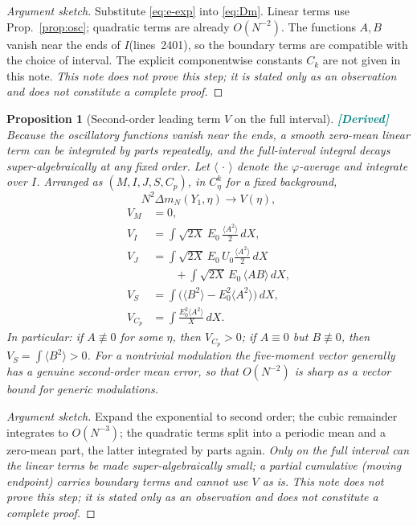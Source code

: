 \documentclass[11pt,a4paper]{article}
\newtheorem{proposition}[theorem]{Proposition}
\theoremstyle{definition}
\theoremstyle{remark}
\newcommand{\lnos}[1]{(lines~#1)}
\newcommand{\DER}{\textcolor{teal}{\textbf{[Derived]}}}
\newcommand{\notproved}{\emph{This note does not prove this step; it is stated only as an observation
and does not constitute a complete proof.}}
\begin{document}
\begin{proof}[Argument sketch]
Substitute \eqref{eq:e-exp} into \eqref{eq:Dm}. Linear terms use Prop.~\ref{prop:osc};
quadratic terms are already $O(N^{-2})$. The functions $A,B$ vanish near the ends of $I$\lnos{2401},
so the boundary terms are compatible with the choice of interval.
The explicit componentwise constants $C_k$ are not given in this note.
\notproved
\end{proof}

\begin{proposition}[Second-order leading term $V$ on the full interval]
\label{prop:V}
\DER
Because the oscillatory functions vanish near the ends, a smooth zero-mean linear term can be integrated
by parts repeatedly, and the full-interval integral decays super-algebraically at any fixed order.
Let $\langle\,\cdot\,\rangle$ denote the $\varphi$-average and integrate over $I$. Arranged as
$(M,I,J,S,C_p)$, in $C^k_\eta$ for a fixed background,
\[
N^2\Delta m_N(Y_1,\eta)\to V(\eta),
\]
\begin{equation}
\label{eq:V}
\begin{aligned}
V_M&=0,\\
V_I&=\int\sqrt{2X}\,E_0\,\frac{\langle A^2\rangle}{2}\,dX,\\
V_J&=\int\sqrt{2X}\,E_0\,U_0\frac{\langle A^2\rangle}{2}\,dX\\
&\qquad+\int\sqrt{2X}\,E_0\,\langle AB\rangle\,dX,\\
V_S&=\int\bigl(\langle B^2\rangle-E_0^2\langle A^2\rangle\bigr)\,dX,\\
V_{C_p}&=\int\frac{E_0^2\langle A^2\rangle}{X}\,dX.
\end{aligned}
\end{equation}
In particular: if $A\not\equiv 0$ for some $\eta$, then $V_{C_p}>0$;
if $A\equiv 0$ but $B\not\equiv 0$, then $V_S=\int\langle B^2\rangle>0$.
For a nontrivial modulation the five-moment vector generally has a genuine second-order mean error,
so that $O(N^{-2})$ is sharp as a vector bound for generic modulations.
\end{proposition}

\begin{proof}[Argument sketch]
Expand the exponential to second order; the cubic remainder integrates to $O(N^{-3})$;
the quadratic terms split into a periodic mean and a zero-mean part, the latter integrated by parts again.
\emph{Only on the full interval can the linear terms be made super-algebraically small; a partial
cumulative (moving endpoint) carries boundary terms and cannot use $V$ as is.}
\notproved
\end{proof}
\end{document}
